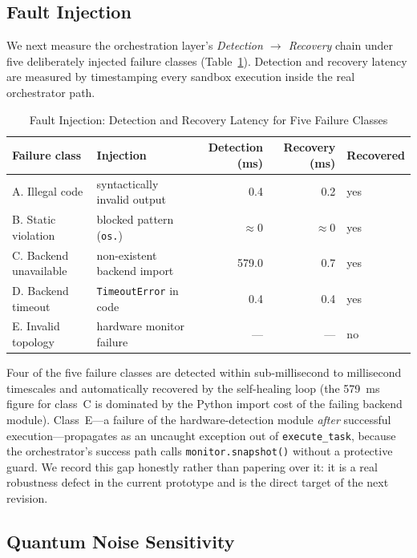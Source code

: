 ﻿\documentclass[12pt,a4paper]{article}
\begin{document}
\subsection{Fault Injection}\label{sec:fault}

We next measure the orchestration layer's \emph{Detection $\rightarrow$ Recovery} chain under five deliberately injected failure classes (Table~\ref{tab:fault}). Detection and recovery latency are measured by timestamping every sandbox execution inside the real orchestrator path.

\begin{table}[H]
\centering
\caption{Fault Injection: Detection and Recovery Latency for Five Failure Classes}
\label{tab:fault}
\small
\begin{tabularx}{\textwidth}{@{}l>{\raggedright\arraybackslash}Xrrl@{}}
\toprule
\textbf{Failure class} & \textbf{Injection} & \textbf{Detection (ms)} & \textbf{Recovery (ms)} & \textbf{Recovered} \\
\midrule
A. Illegal code & syntactically invalid output & 0.4 & 0.2 & yes \\
B. Static violation & blocked pattern (\texttt{os.}) & $\approx$0 & $\approx$0 & yes \\
C. Backend unavailable & non-existent backend import & 579.0 & 0.7 & yes \\
D. Backend timeout & \texttt{TimeoutError} in code & 0.4 & 0.4 & yes \\
E. Invalid topology & hardware monitor failure & --- & --- & no \\
\bottomrule
\end{tabularx}
\end{table}

Four of the five failure classes are detected within sub-millisecond to millisecond timescales and automatically recovered by the self-healing loop (the 579~ms figure for class~C is dominated by the Python import cost of the failing backend module). Class~E---a failure of the hardware-detection module \emph{after} successful execution---propagates as an uncaught exception out of \texttt{execute\_task}, because the orchestrator's success path calls \texttt{monitor.snapshot()} without a protective guard. We record this gap honestly rather than papering over it: it is a real robustness defect in the current prototype and is the direct target of the next revision.

\subsection{Quantum Noise Sensitivity}\label{sec:noise}
\end{document}
